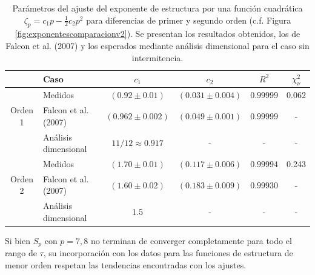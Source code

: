 \begin{table}[!t]  %
	\centering
	\begin{tabular}{ | c | l | c | c | c | c |} %
		\hline
		& Caso  & $c_1$ & $c_2$ & $R^2$ & $\chi_\nu^2$ \\
		\hline
		& Medidos & $(0.92 \pm 0.01)$ & $(0.031 \pm 0.004)$ & $0.99999$ & 0.062\\
		Orden 1 &  Falcon et al. (2007) & $(0.962 \pm 0.002)$ & $(0.049 \pm 0.001)$ & $0.99999$ & - \\
		& Análisis dimensional & $11/12\approx0.917$ & - & - & - \\ 
		\hline 
		& Medidos & $(1.70 \pm 0.01)$ & $(0.117 \pm 0.006)$ & $0.99994$ & 0.243 \\
		Orden 2 &  Falcon et al. (2007) & $(1.60 \pm 0.02)$ & $(0.183 \pm 0.009)$ & $0.99930$ & - \\ 
		& Análisis dimensional & 1.5 & - & - & - \\ 
		\hline
	\end{tabular}
	\caption{Parámetros del ajuste del exponente de estructura por una función cuadrática $\zeta_p = c_1 p - \tfrac{1}{2} c_2 p^2$ para diferencias de primer y segundo orden (c.f. Figura \ref{fig:exponentescomparacionv2}). Se presentan los resultados obtenidos, los de Falcon et al. (2007) \cite{falconObservationIntermittencyWave2007} y los esperados mediante análisis dimensional para el caso sin intermitencia. } %
	\label{tab:zeta_p_fit} 
\end{table}


Si bien $S_p$ con $p=7,8$ no terminan de converger completamente para todo el rango de $\tau$, su incorporación con los datos para las funciones de estructura de  menor orden respetan las tendencias encontradas con los ajustes. 

